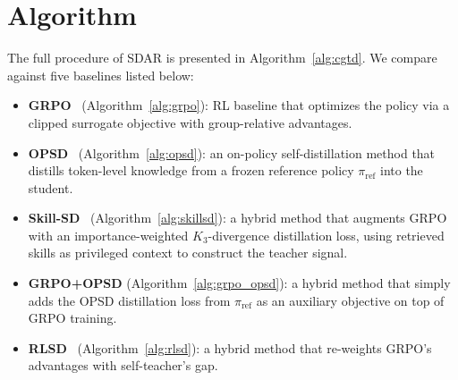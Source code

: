 \documentclass{llmxive}
\providecommand{\methodname}{\textsc{SDAR}\xspace}
\begin{document}
\section{Algorithm}
\label{appendix:algorithm}
The full procedure of \methodname{} is presented in Algorithm~\ref{alg:cgtd}.
We compare against five baselines listed below:
\begin{itemize}
  \item \textbf{GRPO}~\citep{shao2024deepseekmath} (Algorithm~\ref{alg:grpo}): RL baseline that optimizes the policy via a clipped surrogate objective with group-relative advantages.
  \item \textbf{OPSD}~\citep{zhao2026opsd} (Algorithm~\ref{alg:opsd}): an on-policy self-distillation method that distills token-level knowledge from a frozen reference policy $\pi_{\mathrm{ref}}$ into the student.
  \item \textbf{Skill-SD}~\citep{wang2026skillsd} (Algorithm~\ref{alg:skillsd}): a hybrid method that augments GRPO with an importance-weighted $K_3$-divergence distillation loss, using retrieved skills as privileged context to construct the teacher signal.
  \item \textbf{GRPO+OPSD} (Algorithm~\ref{alg:grpo_opsd}): a hybrid method that simply adds the OPSD distillation loss from $\pi_{\mathrm{ref}}$ as an auxiliary objective on top of GRPO training.
  \item \textbf{RLSD}~\citep{yang2026rlsd} (Algorithm~\ref{alg:rlsd}): a hybrid method that re-weights GRPO's advantages with self-teacher's gap.
\end{itemize}
\end{document}
